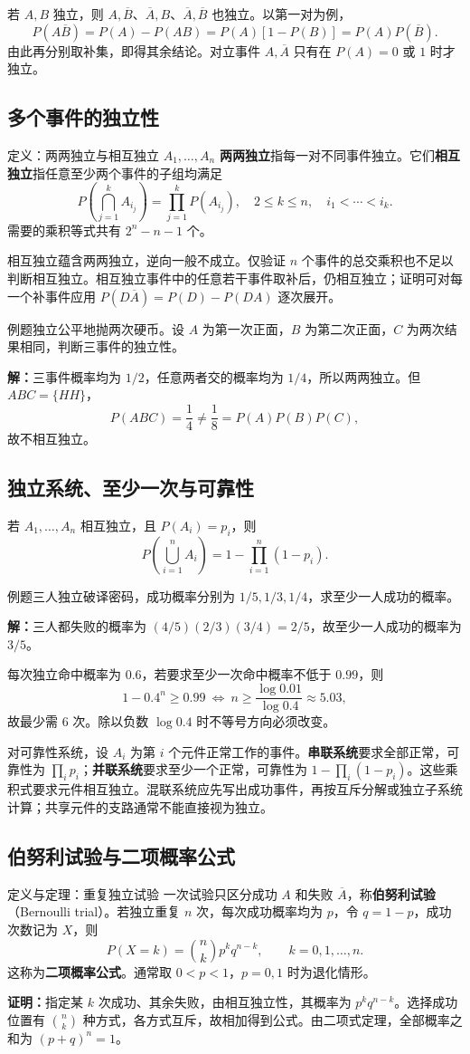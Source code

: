 \documentclass[UTF8,fontset=none,zihao=-4,a4paper]{ctexart}
\newcommand{\term}[1]{\textbf{#1}}
\newcommand{\example}[1]{\begin{infobox}{例题}#1\end{infobox}}
\newcommand{\solution}{\par\noindent\textbf{解：}}
\newcommand{\proof}{\par\noindent\textbf{证明：}}
\newcommand{\com}[2]{\binom{#1}{#2}}
\begin{document}
若 $A,B$ 独立，则 $A,\overline B$、$\overline A,B$、$\overline A,\overline B$ 也独立。以第一对为例，
\[
P(A\overline B)=P(A)-P(AB)=P(A)[1-P(B)]=P(A)P(\overline B).
\]
由此再分别取补集，即得其余结论。对立事件 $A,\overline A$ 只有在 $P(A)=0$ 或 $1$ 时才独立。
\subsection{多个事件的独立性}
\begin{infobox}{定义：两两独立与相互独立}
$A_1,\ldots,A_n$ \term{两两独立}指每一对不同事件独立。它们\term{相互独立}指任意至少两个事件的子组均满足
\[
P\left(\bigcap_{j=1}^{k} A_{i_j}\right)=\prod_{j=1}^{k}P(A_{i_j}),
\quad 2\le k\le n,\quad i_1<\cdots<i_k.
\]
需要的乘积等式共有 $2^n-n-1$ 个。
\end{infobox}
相互独立蕴含两两独立，逆向一般不成立。仅验证 $n$ 个事件的总交乘积也不足以判断相互独立。相互独立事件中的任意若干事件取补后，仍相互独立；证明可对每一个补事件应用 $P(D\overline A)=P(D)-P(DA)$ 逐次展开。
\example{独立公平地抛两次硬币。设 $A$ 为第一次正面，$B$ 为第二次正面，$C$ 为两次结果相同，判断三事件的独立性。}
\solution 三事件概率均为 $1/2$，任意两者交的概率均为 $1/4$，所以两两独立。但 $ABC=\{HH\}$，
\[
P(ABC)=\frac14\ne\frac18=P(A)P(B)P(C),
\]
故不相互独立。
\subsection{独立系统、至少一次与可靠性}
若 $A_1,\ldots,A_n$ 相互独立，且 $P(A_i)=p_i$，则
\[
P\left(\bigcup_{i=1}^n A_i\right)=1-\prod_{i=1}^n(1-p_i).
\]
\example{三人独立破译密码，成功概率分别为 $1/5,1/3,1/4$，求至少一人成功的概率。}
\solution 三人都失败的概率为 $(4/5)(2/3)(3/4)=2/5$，故至少一人成功的概率为 $3/5$。

每次独立命中概率为 $0.6$，若要求至少一次命中概率不低于 $0.99$，则
\[
1-0.4^n\ge0.99\ \Longleftrightarrow\ n\ge\frac{\log0.01}{\log0.4}\approx5.03,
\]
故最少需 $6$ 次。除以负数 $\log0.4$ 时不等号方向必须改变。

对可靠性系统，设 $A_i$ 为第 $i$ 个元件正常工作的事件。\term{串联系统}要求全部正常，可靠性为 $\prod_i p_i$；\term{并联系统}要求至少一个正常，可靠性为 $1-\prod_i(1-p_i)$。这些乘积式要求元件相互独立。混联系统应先写出成功事件，再按互斥分解或独立子系统计算；共享元件的支路通常不能直接视为独立。
\subsection{伯努利试验与二项概率公式}
\begin{infobox}{定义与定理：重复独立试验}
一次试验只区分成功 $A$ 和失败 $\overline A$，称\term{伯努利试验}（Bernoulli trial）。若独立重复 $n$ 次，每次成功概率均为 $p$，令 $q=1-p$，成功次数记为 $X$，则
\[
P(X=k)=\com nk p^kq^{n-k},\qquad k=0,1,\ldots,n.
\]
这称为\term{二项概率公式}。通常取 $0<p<1$，$p=0,1$ 时为退化情形。
\end{infobox}
\proof 指定某 $k$ 次成功、其余失败，由相互独立性，其概率为 $p^kq^{n-k}$。选择成功位置有 $\com nk$ 种方式，各方式互斥，故相加得到公式。由二项式定理，全部概率之和为 $(p+q)^n=1$。
\end{document}
